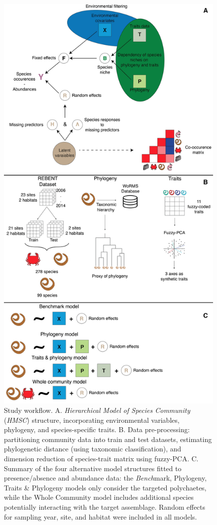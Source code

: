 \begin{refsection}
\begin{figure}
\hypertarget{fig:chapt1workflow}{%
\centering
\includegraphics{03-Chapitre1/figures/fig1.png}
\caption[Study workflow]{Study workflow. A. \emph{Hierarchical Model of Species
Community} (\emph{HMSC}) structure, incorporating environmental
variables, phylogeny, and species-specific traits. B. Data
pre-processing: partitioning community data into train and test
datasets, estimating phylogenetic distance (using taxonomic
classification), and dimension reduction of species-trait matrix using
fuzzy-PCA. C. Summary of the four alternative model structures fitted to
presence/absence and abundance data: the \emph{Bench}mark, Phylogeny,
Traits \& Phylogeny models only consider the targeted polychaetes, while
the Whole Community model includes additional species potentially
interacting with the target assemblage. Random effects for sampling
year, site, and habitat were included in all
models.}\label{fig:chapt1workflow}
}
\end{figure}


\end{refsection}
